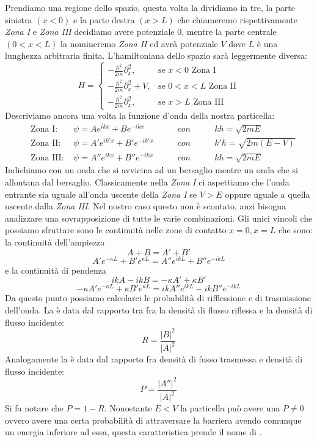 Prendiamo una regione dello spazio, questa volta la dividiamo in tre, la parte sinistra $(x < 0)$ e la parte destra $(x > L)$ che chiameremo rispettivamente \textit{Zona I} e \textit{Zona III} decidiamo avere potenziale $0$, mentre la parte centrale $(0 < x < L)$ la nomineremo \textit{Zona II} ed avrà potenziale $V$ dove $L$ è una lunghezza arbitraria finita. L'hamiltoniana dello spazio sarà leggermente diversa:
$$H=\begin{cases}
 - \frac{\hbar^2}{2m} \partial_x^2, & \mbox{se } x<0 \mbox{ Zona I} \\
 - \frac{\hbar^2}{2m} \partial_x^2 + V, & \mbox{se } 0<x<L \mbox{ Zona II} \\
 - \frac{\hbar^2}{2m} \partial_x^2, & \mbox{se } x>L \mbox{ Zona III}
\end{cases}$$
Descriviamo ancora una volta la funzione d'onda della nostra particella:
\begin{equation}
\begin{aligned}
  \quad \mbox{Zona I: }   &\psi = Ae^{ikx} + Be^{-ikx} \qquad     & con \qquad & k\hbar = \sqrt{2mE}\\
  \quad \mbox{Zona II: }  &\psi = A'e^{ik'x} + B'e^{-ik'x} \qquad & con \qquad & k'\hbar = \sqrt{2m(E-V)}\\
  \quad \mbox{Zona III: } &\psi = A''e^{ikx} + B''e^{-ikx} \qquad & con \qquad & k\hbar = \sqrt{2mE}
\end{aligned}
\end{equation}
Indichiamo con  un onda che si avvicina ad un bersaglio mentre  un onda che si allontana dal bersaglio. Classicamente nella \textit{Zona I} ci aspettiamo che l'onda entrante sia uguale all'onda uscente della \textit{Zona I} se $V > E$ oppure uguale a quella uscente dalla \textit{Zona III}. Nel nostro caso questo non è scontato, anzi bisogna analizzare una sovrapposizione di tutte le varie combinazioni. Gli unici vincoli che possiamo sfruttare sono le continuità nelle zone di contatto $ x = 0, x = L$ che sono: la continuità dell'ampiezza
$$A + B = A' + B'$$
$$A'e^{-\kappa L} + B'e^{\kappa L} = A''e^{ikL} + B''e^{-ikL}$$
e la continuità di pendenza
$$ikA - ikB = -\kappa A' + \kappa B'$$
$$-\kappa A'e^{-\kappa L} + \kappa B'e^{\kappa L} = ikA''e^{ikL} - ikB''e^{-ikL}$$
Da questo punto possiamo calcolarci le probabilità di rifflessione e di trasmissione dell'onda.
La  è data dal rapporto tra fra la densità di flusso riflessa e la densità di flusso incidente:
$$R = \frac{|B|^2}{|A|^2}$$
Analogamente la  è data dal rapporto fra densità di fusso trasmessa e densità di flusso incidente:
$$P = \frac{|A''|^2}{|A|^2}$$
Si fa notare che $P = 1 - R$. Nonostante $E < V$ la particella può avere una $P \ne 0$ ovvero avere una certa probabilità di attraversare la barriera avendo comunque un energia inferiore ad essa, questa caratteristica prende il nome di .


